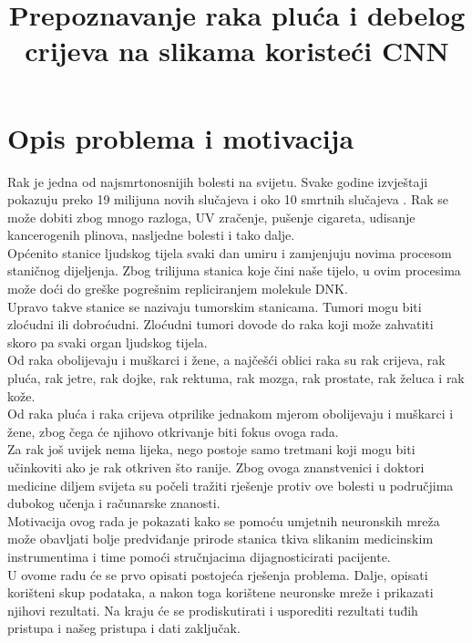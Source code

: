 \documentclass[conference, utf8]{IEEEtran}
\begin{document}
\title{Prepoznavanje raka pluća i debelog crijeva na slikama koristeći CNN}

\author{
\and
{}
\and
{}
\and
{}
\and
{}
\and
{}
}

\maketitle

\section{Opis problema i motivacija}
Rak je jedna od najsmrtonosnijih bolesti na svijetu. Svake godine izvještaji pokazuju preko 19 milijuna novih slučajeva i oko 10 smrtnih slučajeva \cite{world2019international}. Rak se može dobiti zbog mnogo razloga, UV zračenje, pušenje cigareta, udisanje kancerogenih plinova, nasljedne bolesti i tako dalje.
\\
Općenito stanice ljudskog tijela svaki dan umiru i zamjenjuju novima procesom staničnog dijeljenja. Zbog trilijuna stanica koje čini naše tijelo, u ovim procesima može doći do greške pogrešnim repliciranjem molekule DNK.
\\
Upravo takve stanice se nazivaju tumorskim stanicama. Tumori mogu biti zloćudni ili dobroćudni. Zloćudni tumori dovode do raka koji može zahvatiti skoro pa svaki organ ljudskog tijela.
\\
Od raka obolijevaju i muškarci i žene, a najčešći oblici raka su rak crijeva, rak pluća, rak jetre, rak dojke, rak rektuma, rak mozga, rak prostate, rak želuca i rak kože.
\\
Od raka pluća i raka crijeva otprilike jednakom mjerom obolijevaju i muškarci i žene, zbog čega će njihovo otkrivanje biti fokus ovoga rada.
\\
Za rak još uvijek nema lijeka, nego postoje samo tretmani koji mogu biti učinkoviti ako je rak otkriven što ranije.
Zbog ovoga znanstvenici i doktori medicine diljem svijeta su počeli tražiti rješenje protiv ove bolesti u područjima dubokog učenja i računarske znanosti.
\\
Motivacija ovog rada je pokazati kako se pomoću umjetnih neuronskih mreža može obavljati bolje predviđanje prirode stanica tkiva slikanim medicinskim instrumentima i time pomoći stručnjacima dijagnosticirati pacijente.
\\
U ovome radu će se prvo opisati postojeća rješenja problema. Dalje, opisati korišteni skup podataka, a nakon toga korištene neuronske mreže i prikazati njihovi rezultati. Na kraju će se prodiskutirati i usporediti rezultati tuđih pristupa i našeg pristupa i dati zaključak.
\end{document}
